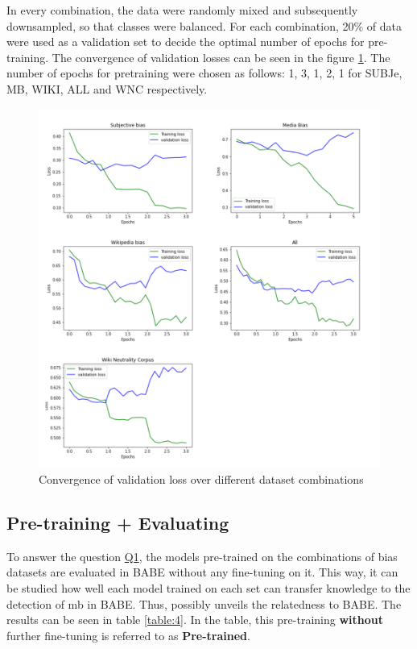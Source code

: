 In every combination, the data were randomly mixed and subsequently downsampled, so that classes were balanced. For each combination, 20\% of data were used as a validation set to decide the optimal number of epochs for pre-training. The convergence of validation losses can be seen in the figure \ref{fig:all_losses}. The number of epochs for pretraining were chosen as follows: 1, 3, 1, 2, 1 for SUBJe, MB, WIKI, ALL and WNC respectively.
\begin{figure}
  \includegraphics[scale=0.5]{my_modules/multimedia/all_losses.png}
  \caption{Convergence of validation loss over different dataset combinations}
  \label{fig:all_losses}
\end{figure}


\subsection{Pre-training + Evaluating}
To answer the question \hyperref[Q1]{Q1}, the models pre-trained on the combinations of bias datasets are evaluated in BABE without any fine-tuning on it. This way, it can be studied how well each model trained on each set can transfer knowledge to the detection of \gls{mb} in BABE. Thus, possibly unveils the relatedness to BABE. The results can be seen in table \ref{table:4}. In the table, this pre-training \textbf{without} further fine-tuning is referred to as \textbf{Pre-trained}.


